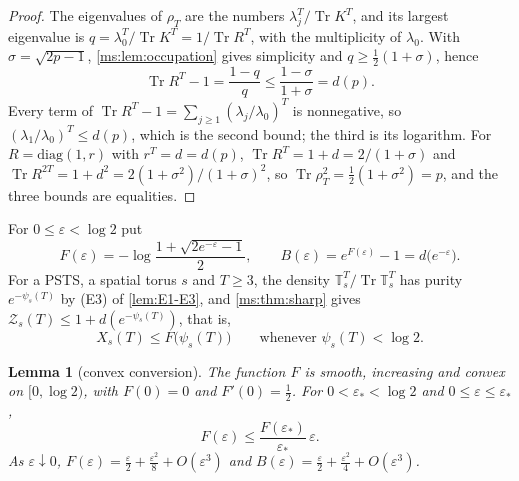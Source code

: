 \documentclass[11pt,a4paper]{amsart}
\newtheorem{lemma}[theorem]{Lemma}
\theoremstyle{definition}
\theoremstyle{remark}
\numberwithin{equation}{section}
\DeclareMathOperator{\Tr}{Tr}        %
\newcommand{\PSTS}{\textup{PSTS}}          %
\newcommand{\TT}{\mathbb{T}}               %
\newcommand{\Zc}{\mathcal{Z}}              %
\newcommand{\Zs}[2]{\Zc_{#1}(#2)}          %
\newcommand{\XT}[2]{X_{#1}(#2)}            %
\newcommand{\psiT}[2]{\psi_{#1}(#2)}       %
\begin{document}
\begin{proof}
The eigenvalues of $\rho_T$ are the numbers $\lambda_j^T/\Tr K^T$, and its largest eigenvalue is $q=\lambda_0^T/\Tr K^T=1/\Tr R^T$, with the multiplicity of $\lambda_0$. With $\sigma=\sqrt{2p-1}$, \cref{ms:lem:occupation} gives simplicity and $q\ge\frac12(1+\sigma)$, hence
\[
\Tr R^T-1=\frac{1-q}{q}\le\frac{1-\sigma}{1+\sigma}=d(p).
\]
Every term of $\Tr R^T-1=\sum_{j\ge1}(\lambda_j/\lambda_0)^T$ is nonnegative, so $(\lambda_1/\lambda_0)^T\le d(p)$, which is the second bound; the third is its logarithm. For $R=\mathrm{diag}(1,r)$ with $r^T=d=d(p)$, $\Tr R^T=1+d=2/(1+\sigma)$ and $\Tr R^{2T}=1+d^2=2(1+\sigma^2)/(1+\sigma)^2$, so $\Tr\rho_T^2=\frac12(1+\sigma^2)=p$, and the three bounds are equalities.
\end{proof}

For $0\le\varepsilon<\log2$ put
\[
F(\varepsilon)=-\log\frac{1+\sqrt{2e^{-\varepsilon}-1}}{2},\qquad B(\varepsilon)=e^{F(\varepsilon)}-1=d\bigl(e^{-\varepsilon}\bigr).
\]
For a \PSTS{}, a spatial torus $s$ and $T\ge3$, the density $\TT_s^T/\Tr\TT_s^T$ has purity $e^{-\psiT{s}{T}}$ by (E3) of \cref{lem:E1-E3}, and \cref{ms:thm:sharp} gives $\Zs{s}{T}\le1+d(e^{-\psiT{s}{T}})$, that is,
\begin{equation}\label{ms:eq:pressure-form}
\XT{s}{T}\le F\bigl(\psiT{s}{T}\bigr)\qquad\text{whenever }\psiT{s}{T}<\log2 .
\end{equation}

\begin{lemma}[convex conversion]\label{ms:lem:convex}
The function $F$ is smooth, increasing and convex on $[0,\log2)$, with $F(0)=0$ and $F'(0)=\frac12$. For $0<\varepsilon_*<\log2$ and $0\le\varepsilon\le\varepsilon_*$,
\begin{equation}\label{ms:eq:chord}
F(\varepsilon)\le\frac{F(\varepsilon_*)}{\varepsilon_*}\,\varepsilon .
\end{equation}
As $\varepsilon\downarrow0$, $F(\varepsilon)=\frac\varepsilon2+\frac{\varepsilon^2}8+O(\varepsilon^3)$ and $B(\varepsilon)=\frac\varepsilon2+\frac{\varepsilon^2}4+O(\varepsilon^3)$.
\end{lemma}
\end{document}
